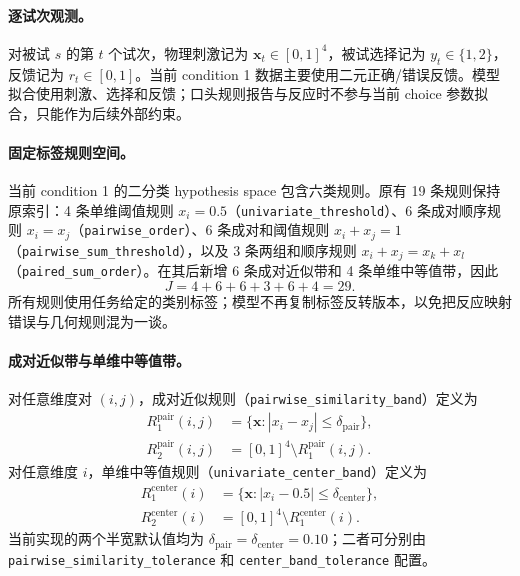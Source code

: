\paragraph{逐试次观测。}
对被试 $s$ 的第 $t$ 个试次，物理刺激记为 $\mathbf x_t\in[0,1]^4$，被试选择记为 $y_t\in\{1,2\}$，反馈记为 $r_t\in[0,1]$。当前 condition 1 数据主要使用二元正确/错误反馈。模型拟合使用刺激、选择和反馈；口头规则报告与反应时不参与当前 choice 参数拟合，只能作为后续外部约束。

\paragraph{固定标签规则空间。}
当前 condition 1 的二分类 hypothesis space 包含六类规则。原有 19 条规则保持原索引：4 条单维阈值规则 $x_i=0.5$（\texttt{univariate\_threshold}）、6 条成对顺序规则 $x_i=x_j$（\texttt{pairwise\_order}）、6 条成对和阈值规则 $x_i+x_j=1$（\texttt{pairwise\_sum\_threshold}），以及 3 条两组和顺序规则 $x_i+x_j=x_k+x_l$（\texttt{paired\_sum\_order}）。在其后新增 6 条成对近似带和 4 条单维中等值带，因此
\begin{equation}
J=4+6+6+3+6+4=29.
\label{eq:model0811-hypothesis-count}
\end{equation}
所有规则使用任务给定的类别标签；模型不再复制标签反转版本，以免把反应映射错误与几何规则混为一谈。

\paragraph{成对近似带与单维中等值带。}
对任意维度对 $(i,j)$，成对近似规则（\texttt{pairwise\_similarity\_band}）定义为
\begin{align}
R_1^{\mathrm{pair}}(i,j)
&=\{\mathbf x:|x_i-x_j|\leq\delta_{\mathrm{pair}}\},
\nonumber\\
R_2^{\mathrm{pair}}(i,j)
&=[0,1]^4\setminus R_1^{\mathrm{pair}}(i,j).
\label{eq:model0811-pair-similarity-band}
\end{align}
对任意维度 $i$，单维中等值规则（\texttt{univariate\_center\_band}）定义为
\begin{align}
R_1^{\mathrm{center}}(i)
&=\{\mathbf x:|x_i-0.5|\leq\delta_{\mathrm{center}}\},
\nonumber\\
R_2^{\mathrm{center}}(i)
&=[0,1]^4\setminus R_1^{\mathrm{center}}(i).
\label{eq:model0811-center-band}
\end{align}
当前实现的两个半宽默认值均为 $\delta_{\mathrm{pair}}=\delta_{\mathrm{center}}=0.10$；二者可分别由 \texttt{pairwise\_similarity\_tolerance} 和 \texttt{center\_band\_tolerance} 配置。

